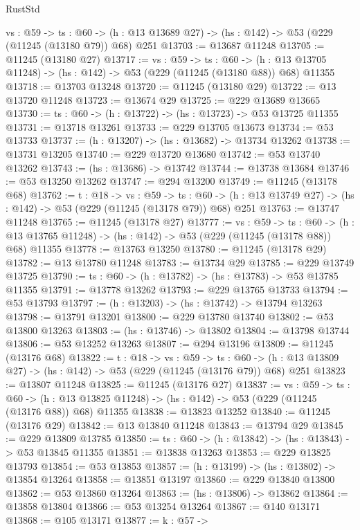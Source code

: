 \begin{lexlean}{RustStd}
\begin{coremodule}
  {vs : @59} ->
  {ts : @60} -> (h : @13 @13689 @27) -> (hs : @142) -> @53 (@229 (@11245 (@13180 @79)) @68) @251
@13703 := @13687 @11248
@13705 := @11245 (@13180 @27)
@13717 := {vs : @59} ->
  {ts : @60} ->
  (h : @13 @13705 @11248) -> (hs : @142) -> @53 (@229 (@11245 (@13180 @88)) @68) @11355
@13718 := @13703 @13248
@13720 := @11245 (@13180 @29)
@13722 := @13 @13720 @11248
@13723 := @13674 @29
@13725 := @229 @13689 @13665
@13730 := {ts : @60} -> (h : @13722) -> (hs : @13723) -> @53 @13725 @11355
@13731 := @13718 @13261
@13733 := @229 @13705 @13673
@13734 := @53 @13733
@13737 := (h : @13207) -> (hs : @13682) -> @13734 @13262
@13738 := @13731 @13205
@13740 := @229 @13720 @13680
@13742 := @53 @13740 @13262
@13743 := (hs : @13686) -> @13742
@13744 := @13738 @13684
@13746 := @53 @13250 @13262
@13747 := @294 @13200
@13749 := @11245 (@13178 @68)
@13762 := {t : @18} ->
  {vs : @59} ->
  {ts : @60} -> (h : @13 @13749 @27) -> (hs : @142) -> @53 (@229 (@11245 (@13178 @79)) @68) @251
@13763 := @13747 @11248
@13765 := @11245 (@13178 @27)
@13777 := {vs : @59} ->
  {ts : @60} ->
  (h : @13 @13765 @11248) -> (hs : @142) -> @53 (@229 (@11245 (@13178 @88)) @68) @11355
@13778 := @13763 @13250
@13780 := @11245 (@13178 @29)
@13782 := @13 @13780 @11248
@13783 := @13734 @29
@13785 := @229 @13749 @13725
@13790 := {ts : @60} -> (h : @13782) -> (hs : @13783) -> @53 @13785 @11355
@13791 := @13778 @13262
@13793 := @229 @13765 @13733
@13794 := @53 @13793
@13797 := (h : @13203) -> (hs : @13742) -> @13794 @13263
@13798 := @13791 @13201
@13800 := @229 @13780 @13740
@13802 := @53 @13800 @13263
@13803 := (hs : @13746) -> @13802
@13804 := @13798 @13744
@13806 := @53 @13252 @13263
@13807 := @294 @13196
@13809 := @11245 (@13176 @68)
@13822 := {t : @18} ->
  {vs : @59} ->
  {ts : @60} -> (h : @13 @13809 @27) -> (hs : @142) -> @53 (@229 (@11245 (@13176 @79)) @68) @251
@13823 := @13807 @11248
@13825 := @11245 (@13176 @27)
@13837 := {vs : @59} ->
  {ts : @60} ->
  (h : @13 @13825 @11248) -> (hs : @142) -> @53 (@229 (@11245 (@13176 @88)) @68) @11355
@13838 := @13823 @13252
@13840 := @11245 (@13176 @29)
@13842 := @13 @13840 @11248
@13843 := @13794 @29
@13845 := @229 @13809 @13785
@13850 := {ts : @60} -> (h : @13842) -> (hs : @13843) -> @53 @13845 @11355
@13851 := @13838 @13263
@13853 := @229 @13825 @13793
@13854 := @53 @13853
@13857 := (h : @13199) -> (hs : @13802) -> @13854 @13264
@13858 := @13851 @13197
@13860 := @229 @13840 @13800
@13862 := @53 @13860 @13264
@13863 := (hs : @13806) -> @13862
@13864 := @13858 @13804
@13866 := @53 @13254 @13264
@13867 := @140 @13171
@13868 := @105 @13171
@13877 := {k : @57} ->

\end{coremodule}
\end{lexlean}
